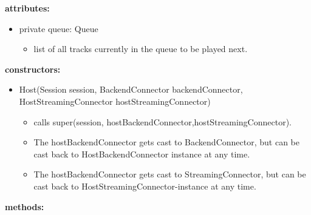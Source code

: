 \documentclass[oneside, ngerman]{sdqtechreport}
\begin{document}
\textbf{attributes:}
\begin{itemize}
    \item private queue: Queue
    \begin{itemize}
        \item list of all tracks currently in the queue to be played next.
    \end{itemize}
\end{itemize}
\textbf{constructors:}
\begin{itemize}
    \item Host(Session session, BackendConnector backendConnector, HostStreamingConnector hostStreamingConnector)
    \begin{itemize}
        \item calls super(session, hostBackendConnector,hostStreamingConnector).
        \item The hostBackendConnector gets cast to BackendConnector, but can be cast back to HostBackendConnector instance at any time.
        \item The hostBackendConnector gets cast to StreamingConnector, but can be cast back to HostStreamingConnector-instance at any time.
    \end{itemize}
\end{itemize}
\textbf{methods:}
\end{document}
